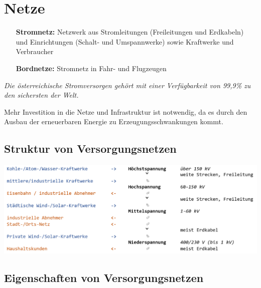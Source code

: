 \section{Netze}


\begin{itemize}
    \item[\textbf{Stromnetz:}] Netzwerk aus Stromleitungen (Freileitungen und Erdkabeln) und Einrichtungen (Schalt- und Umspannwerke) sowie Kraftwerke und Verbraucher
    \item[\textbf{Bordnetze:}] Stromnetz in Fahr- und Flugzeugen
\end{itemize}

\vspace{1em}

\textit{Die österreichische Stromversorgen gehört mit einer Verfügbarkeit von 99,9\% zu den sichersten der Welt.}

Mehr Investition in die Netze und Infrastruktur ist notwendig, da es durch den Ausbau der erneuerbaren Energie zu Erzeugungsschwankungen kommt.

\subsection{Struktur von Versorgungsnetzen}

\includegraphics[width=\textwidth]{images/01-Netze/StrukturVersorgungsnetze.png}

\subsection{Eigenschaften von Versorgungsnetzen}

